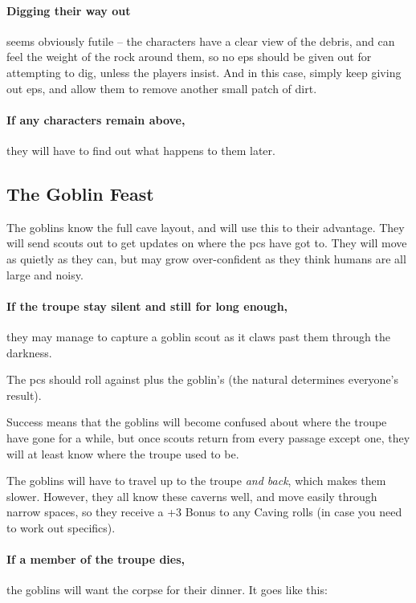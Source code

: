\begin{multicols}{2}
\paragraph{Digging their way out}
seems obviously futile -- the characters have a clear view of the debris, and can feel the weight of the rock around them, so no \glspl{ep} should be given out for attempting to dig, unless the players insist.
And in this case, simply keep giving out \glspl{ep}, and allow them to remove another small patch of dirt.

\paragraph{If any characters remain above,}
they will have to find out what happens to them later.

\subsection{The Goblin Feast}

The goblins know the full cave layout, and will use this to their advantage.
They will send scouts out to get updates on where the \glspl{pc} have got to.
They will move as quietly as they can, but may grow over-confident as they think humans are all large and noisy.

\paragraph{If the troupe stay silent and still for long enough,}
they may manage to capture a goblin scout as it claws past them through the darkness.

The \glspl{pc} should roll   against \tn[5] plus the goblin's  (the \gls{natural} determines everyone's result).

Success means that the goblins will become confused about where the troupe have gone for a while, but once scouts return from every passage except one, they will at least know where the troupe used to be.

The goblins will have to travel up to the troupe \emph{and back}, which makes them slower.
However, they all know these caverns well, and move easily through narrow spaces, so they receive a +3 Bonus to any Caving rolls (in case you need to work out specifics).

\paragraph{If a member of the troupe dies,}
the goblins will want the corpse for their dinner.
It goes like this:


\end{multicols}
